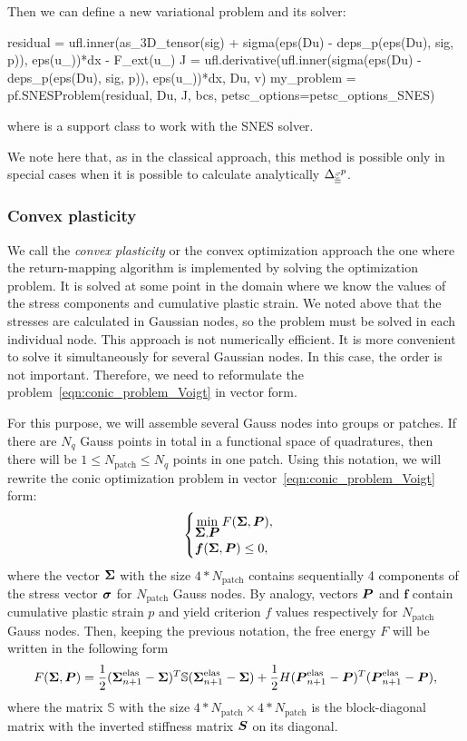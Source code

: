 \documentclass[12pt]{article}
\begin{document}
Then we can define a new variational problem and its solver:
\begin{pythoncode}
    residual = ufl.inner(as_3D_tensor(sig) + sigma(eps(Du) - deps_p(eps(Du), sig, p)), eps(u_))*dx - F_ext(u_)
    J = ufl.derivative(ufl.inner(sigma(eps(Du) - deps_p(eps(Du), sig, p)), eps(u_))*dx, Du, v)
    my_problem = pf.SNESProblem(residual, Du, J, bcs, petsc_options=petsc_options_SNES)
\end{pythoncode}
where  is a support class to work with the SNES solver.

We note here that, as in the classical approach, this method is possible only in special cases when it is possible to calculate analytically $\Delta\underline{\underline{\varepsilon}}^p$.

\subsubsection{Convex plasticity}
We call the \textit{convex plasticity} or the convex optimization approach the one where the return-mapping algorithm is implemented by solving the optimization problem. It is solved at some point in the domain where we know the values of the stress components and cumulative plastic strain. We noted above that the stresses are calculated in Gaussian nodes, so the problem must be solved in each individual node. This approach is not numerically efficient. It is more convenient to solve it simultaneously for several Gaussian nodes. In this case, the order is not important. Therefore, we need to reformulate the problem~\ref{eqn:conic_problem_Voigt} in vector form. 

For this purpose, we will assemble several Gauss nodes into groups or patches. If there are $N_q$ Gauss points in total in a functional space of quadratures, then there will be $1 \leq N_\text{patch} \leq N_q$ points in one patch. Using this notation, we will rewrite the conic optimization problem in vector~\ref{eqn:conic_problem_Voigt} form:
\begin{equation}
    \label{eqn:conic_problem_vectorized}
    \begin{cases}
        \min\limits_{\mbox{\boldmath $\Sigma$}, \mbox{\boldmath $P$}} F(\mbox{\boldmath $\Sigma$}, \mbox{\boldmath $P$}), \\
        \mbox{\boldmath $f$}(\mbox{\boldmath $\Sigma$}, \mbox{\boldmath $P$}) \leq 0,
    \end{cases}
\end{equation}
where the vector $\mbox{\boldmath $\Sigma$}$ with the size $4*N_\text{patch}$ contains sequentially 4 components of the stress vector $\mbox{\boldmath$\sigma$}$ for $N_\text{patch}$ Gauss nodes. By analogy, vectors $\mbox{\boldmath $P$}$ and $\mathbold{f}$ contain cumulative plastic strain $p$ and yield criterion $f$ values respectively for $N_\text{patch}$ Gauss nodes. Then, keeping the previous notation, the free energy $F$ will be written in the following form 
\begin{equation}
    F(\mbox{\boldmath $\Sigma$}, \mbox{\boldmath $P$}) = \frac{1}{2}(\mbox{\boldmath $\Sigma$}_{n+1}^\text{elas} - \mbox{\boldmath $\Sigma$})^T \mathbb{S} (\mbox{\boldmath $\Sigma$}_{n+1}^\text{elas} - \mbox{\boldmath $\Sigma$}) + \frac{1}{2}H(\mbox{\boldmath $P$}_{n+1}^\text{elas} - \mbox{\boldmath $P$})^T(\mbox{\boldmath $P$}_{n+1}^\text{elas} - \mbox{\boldmath $P$}),
\end{equation}
where the matrix $\mathbb{S}$ with the size $4*N_\text{patch}\times4*N_\text{patch}$ is the block-diagonal matrix with the inverted stiffness matrix $\mbox{\boldmath $S$}$ on its diagonal.
\end{document}
